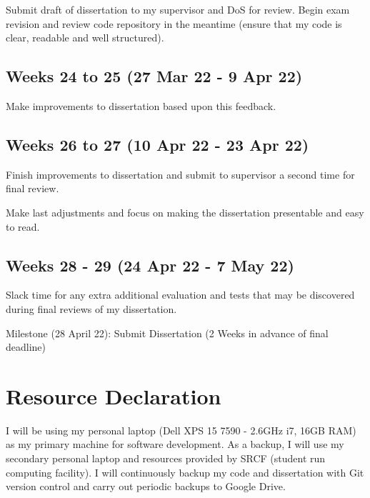 \documentclass[12pt,a4paper,twoside,openright]{report}
\begin{document}
Submit draft of dissertation to my supervisor and DoS for review. Begin exam revision and review code repository in the meantime (ensure that my code is clear, readable and well structured).

\subsection*{Weeks 24 to 25 (27 Mar 22 - 9 Apr 22)}

Make improvements to dissertation based upon this feedback.

\subsection*{Weeks 26 to 27 (10 Apr 22 - 23 Apr 22)}

Finish improvements to dissertation and submit to supervisor a second time for final review. 

Make last adjustments and focus on making the dissertation presentable and easy to read. 

\subsection*{Weeks 28 - 29 (24 Apr 22 - 7 May 22)}

Slack time for any extra additional evaluation and tests that may be discovered during final reviews of my dissertation.

Milestone (28 April 22): Submit Dissertation (2 Weeks in advance of final deadline)

\section*{Resource Declaration}

I will be using my personal laptop (Dell XPS 15 7590 - 2.6GHz i7, 16GB RAM) as my primary machine for software development. As a backup, I will use my secondary personal laptop and resources provided by SRCF (student run computing facility). I will continuously backup my code and dissertation with Git version control and carry out periodic backups to Google Drive.


\newpage

\printbibliography[heading=subbibliography]

\appendix
\end{document}
